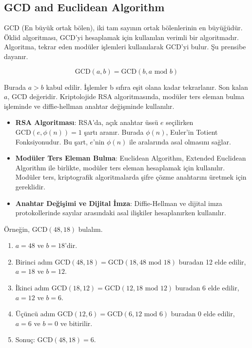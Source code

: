 \newpage

\subsection{GCD and Euclidean Algorithm}

GCD (En büyük ortak bölen), iki tam sayının ortak bölenlerinin en büyüğüdür. Öklid algoritması, GCD'yi hesaplamak için kullanılan verimli bir algoritmadır. Algoritma, tekrar eden modüler işlemleri kullanılarak GCD'yi bulur. Şu prensibe dayanır.

\[ \text{GCD}(a, b) = \text{GCD}(b, a \text{ mod } b) \]

Burada $a > b$ kabul edilir. İşlemler b sıfıra eşit olana kadar tekrarlanır. Son kalan $a$, GCD değeridir. Kriptolojide RSA algoritmasında, modüler ters eleman bulma işleminde ve diffie-hellman anahtar değişminde kullanılır.

\begin{itemize}
    \item \textbf{RSA Algoritması}: RSA'da, açık anahtar üssü $e$ seçilirken $\text{GCD}(e, \phi(n)) = 1$ şartı aranır. Burada $\phi(n)$, Euler'in Totient Fonksiyonudur. Bu şart, $e$'nin $\phi(n)$ ile aralarında asal olmasını sağlar.
    \item \textbf{Modüler Ters Eleman Bulma}: Euclidean Algorithm, Extended Euclidean Algorithm ile birlikte, modüler ters eleman hesaplamak için kullanılır. Modüler ters, kriptografik algoritmalarda şifre çözme anahtarını üretmek için gereklidir.
    \item \textbf{Anahtar Değişimi ve Dijital İmza}: Diffie-Hellman ve dijital imza protokollerinde sayılar arasındaki asal ilişkiler hesaplanırken kullanılır.
\end{itemize}

Örneğin, $\text{GCD}(48, 18)$ bulalım.

\begin{enumerate}
    \item $a = 48$ ve $b = 18$'dir.
    \item Birinci adım $\text{GCD}(48, 18) = \text{GCD}(18, 48 \text{ mod } 18)$ buradan 12 elde edilir, $a = 18$ ve $b = 12$.
    \item İkinci adım $\text{GCD}(18, 12) = \text{GCD}(12, 18 \text{ mod } 12)$ buradan 6 elde edilir, $a = 12$ ve $b = 6$.
    \item Üçüncü adım $\text{GCD}(12, 6) = \text{GCD}(6, 12 \text{ mod } 6)$ buradan 0 elde edilir, $a = 6$ ve $b = 0$ ve bitirilir.
    \item Sonuç: $\text{GCD}(48, 18) = 6$.
\end{enumerate}

